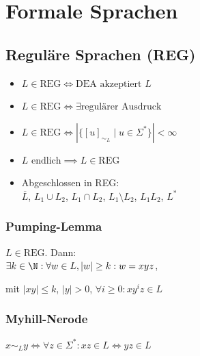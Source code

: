 \section*{Formale Sprachen}

\subsection*{Reguläre Sprachen (REG)}
\begin{itemize}
	\item $L \in \text{REG} \iff \text{DEA akzeptiert $L$}$
	\item $L \in \text{REG} \iff \exists\text{regulärer Ausdruck}$
	\item $L \in \text{REG} \iff |\{[u]_{\sim_L} \mid u \in \Sigma^*\}| < \infty$
	\item $L \text{ endlich} \implies L \in \text{REG}$
	\item Abgeschlossen in REG: \\
		$\overline{L}$, $L_1 \cup L_2$, $L_1 \cap L_2$, $L_1 \setminus L_2$, $L_1 L_2$, $L^*$
\end{itemize}

\subsubsection*{Pumping-Lemma}
$L \in \text{REG}$. Dann:\\
$\exists k \in \N:\forall w \in L, |w| \ge k: w = xyz$,

mit $|xy| \le k$, $|y| > 0$, $\forall i \ge 0: xy^i z \in L$

\subsubsection*{Myhill-Nerode}
$\displaystyle x \sim_L y \iff \forall z\in \Sigma^*: xz \in L \Leftrightarrow yz \in L$
